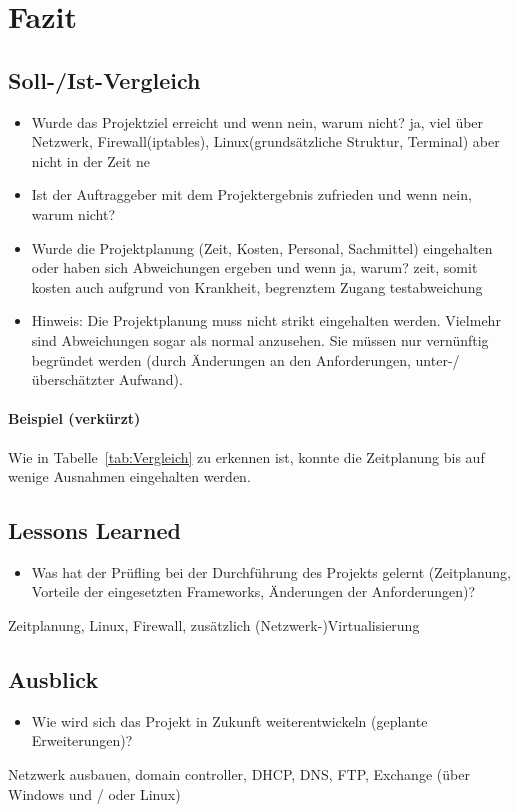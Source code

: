 \section{Fazit} 
\label{sec:Fazit}

\subsection{Soll-/Ist-Vergleich}
\label{sec:SollIstVergleich}

\begin{itemize}
	\item Wurde das Projektziel erreicht und wenn nein, warum nicht?
	ja, viel über Netzwerk, Firewall(iptables), Linux(grundsätzliche Struktur, Terminal)
	aber nicht in der Zeit
	ne
	\item Ist der Auftraggeber mit dem Projektergebnis zufrieden und wenn nein, warum nicht?
	\item Wurde die Projektplanung (Zeit, Kosten, Personal, Sachmittel) eingehalten oder haben sich Abweichungen ergeben und wenn ja, warum?
	zeit, somit kosten
	auch aufgrund von Krankheit, begrenztem Zugang
	testabweichung
	\item Hinweis: Die Projektplanung muss nicht strikt eingehalten werden. Vielmehr sind Abweichungen sogar als normal anzusehen. Sie müssen nur vernünftig begründet werden (\zB durch Änderungen an den Anforderungen, unter-/überschätzter Aufwand).
\end{itemize}



\paragraph{Beispiel (verkürzt)}
Wie in Tabelle~\ref{tab:Vergleich} zu erkennen ist, konnte die Zeitplanung bis auf wenige Ausnahmen eingehalten werden.


\subsection{Lessons Learned}
\label{sec:LessonsLearned}

\begin{itemize}
	\item Was hat der Prüfling bei der Durchführung des Projekts gelernt (\zB Zeitplanung, Vorteile der eingesetzten Frameworks, Änderungen der Anforderungen)?
\end{itemize}
Zeitplanung, Linux, Firewall, zusätzlich (Netzwerk-)Virtualisierung

\subsection{Ausblick}
\label{sec:Ausblick}

\begin{itemize}
	\item Wie wird sich das Projekt in Zukunft weiterentwickeln (\zB geplante Erweiterungen)?
\end{itemize}
Netzwerk ausbauen, domain controller, DHCP, DNS, FTP, Exchange (über Windows und / oder Linux)